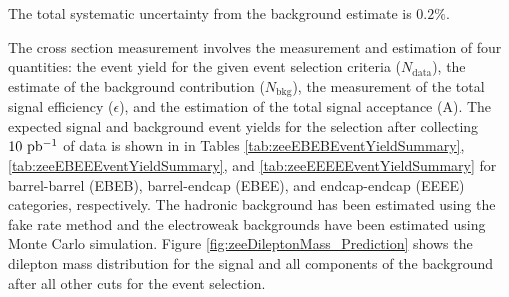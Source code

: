 \documentclass{cmspaper}
\begin{document}
The total systematic uncertainty from the background estimate is $0.2\%$.




\label{sec:crossSectionMeasurement}
The cross section measurement involves the measurement and estimation of four quantities: the event yield for the given event selection criteria ($N_{\mathrm{data}}$), the estimate of the background contribution ($N_{\mathrm{bkg}}$), the measurement of the total signal efficiency ($\epsilon$), and the estimation of the total signal acceptance (A). The expected signal and background event yields for the \Z\To\Ep\Em selection after collecting $10\ \mathrm{pb^{-1}}$ of data is shown in in Tables \ref{tab:zeeEBEBEventYieldSummary}, \ref{tab:zeeEBEEEventYieldSummary}, and \ref{tab:zeeEEEEEventYieldSummary} for barrel-barrel (EBEB), barrel-endcap (EBEE), and endcap-endcap (EEEE) categories, respectively. The hadronic background has been estimated using the fake rate method and the electroweak backgrounds have been estimated using Monte Carlo simulation. Figure \ref{fig:zeeDileptonMass_Prediction} shows the dilepton mass distribution for the signal and all components of the background after all other cuts for the \Z\To\Ep\Em event selection.
\end{document}
